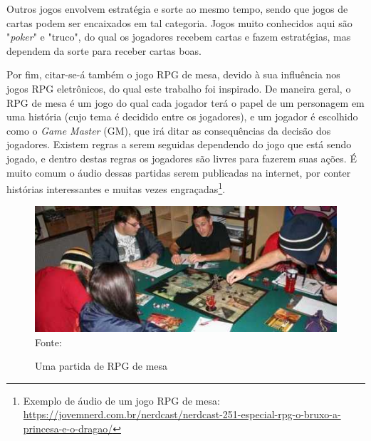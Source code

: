 \documentclass[
	12pt,					%
	openright,				%
	oneside,				%
	a4paper,				%
	bibjustif,				%
	chapter=TITLE,			%
	english,				%
	brazil,					%
	]{abntex2}
\newcommand{\source}[1]{\small Fonte: {#1}}
\begin{document}
		Outros jogos envolvem estratégia e sorte ao mesmo tempo,
		sendo que jogos de cartas podem ser encaixados em tal categoria.
		Jogos muito conhecidos aqui são "\textit{poker}" e "truco",
		do qual os jogadores recebem cartas e fazem estratégias,
		mas dependem da sorte para receber cartas boas.
		
		Por fim, citar-se-á também o jogo RPG de mesa,
		devido à sua influência nos jogos RPG eletrônicos,
		do qual este trabalho foi inspirado.
		De maneira geral, o RPG de mesa é um jogo do qual cada jogador terá o papel de um personagem em uma história
		(cujo tema é decidido entre os jogadores),
		e um jogador é escolhido como o \textit{Game Master} (GM),
		que irá ditar as consequências da decisão dos jogadores.
		Existem regras a serem seguidas dependendo do jogo que está sendo jogado,
		e dentro destas regras os jogadores são livres para fazerem suas ações.
		É muito comum o áudio dessas partidas serem publicadas na internet,
		por conter histórias interessantes e muitas vezes engraçadas\footnote{Exemplo de áudio de um jogo RPG de mesa: \url{https://jovemnerd.com.br/nerdcast/nerdcast-251-especial-rpg-o-bruxo-a-princesa-e-o-dragao/}}.
		
		\begin{figure}[ht!]
			\caption{Uma partida de RPG de mesa}
			\centering
			\includegraphics[scale=1.0]{img/RPG_de_mesa.jpg}\\
			\vspace{0.5mm}
			\source{}
			\label{fig:tableRpg}
		\end{figure}
		
\end{document}
